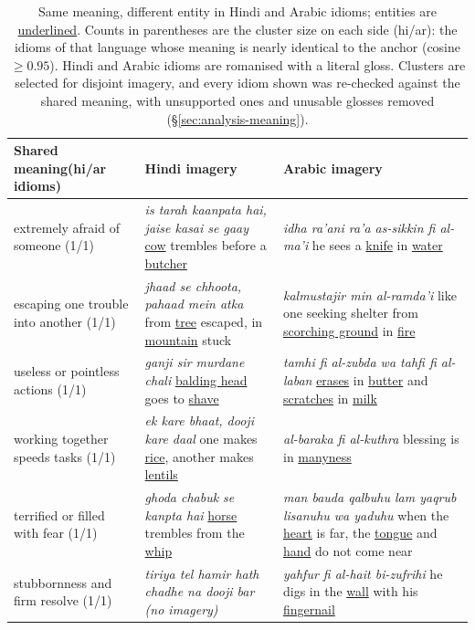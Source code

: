 \begin{table}[t]
\centering
\footnotesize
\setlength{\tabcolsep}{4pt}
\renewcommand{\arraystretch}{1.12}
\caption{Same meaning, different entity in \textcolor{encolor}{Hindi} and \textcolor{zhcolor}{Arabic} idioms; entities are \underline{underlined}. Counts in parentheses are the cluster size on each side (hi/ar): the idioms of that language whose meaning is nearly identical to the anchor (cosine $\geq 0.95$). Hindi and Arabic idioms are romanised with a literal gloss. Clusters are selected for disjoint imagery, and every idiom shown was re-checked against the shared meaning, with unsupported ones and unusable glosses removed (\S\ref{sec:analysis-meaning}).}
\label{tab:meaning-cases-hiar}
\begin{tabular}{@{}p{}p{}p{}@{}}
\toprule
Shared meaning\newline (hi/ar idioms) & \textcolor{encolor}{Hindi imagery} & \textcolor{zhcolor}{Arabic imagery} \\
\midrule
extremely afraid of someone (1/1)
& \textit{is tarah kaanpata hai, jaise kasai se gaay} \underline{cow} trembles before a \underline{butcher}
& \textit{idha ra'ani ra'a as-sikkin fi al-ma'i} he sees a \underline{knife} in \underline{water} \\
escaping one trouble into another (1/1)
& \textit{jhaad se chhoota, pahaad mein atka} from \underline{tree} escaped, in \underline{mountain} stuck
& \textit{kalmustajir min al-ramda'i } like one seeking shelter from \underline{scorching ground} in \underline{fire} \\
useless or pointless actions (1/1)
& \textit{ganji sir murdane chali} \underline{balding head} goes to \underline{shave}
& \textit{tamhi fi al-zubda wa tahfi fi al-laban} \underline{erases} in \underline{butter} and \underline{scratches} in \underline{milk} \\
working together speeds tasks (1/1)
& \textit{ek kare bhaat, dooji kare daal} one makes \underline{rice}, another makes \underline{lentils}
& \textit{al-baraka fi al-kuthra} blessing is in \underline{manyness} \\
terrified or filled with fear (1/1)
& \textit{ghoda chabuk se kanpta hai} \underline{horse} trembles from the \underline{whip}
& \textit{man bauda qalbuhu lam yaqrub lisanuhu wa yaduhu} when the \underline{heart} is far, the \underline{tongue} and \underline{hand} do not come near \\
stubbornness and firm resolve (1/1)
& \textit{tiriya tel hamir hath chadhe na dooji bar} \textit{(no imagery)}
& \textit{yahfur fi al-hait bi-zufrihi} he digs in the \underline{wall} with his \underline{fingernail} \\
\bottomrule
\end{tabular}
\end{table}

